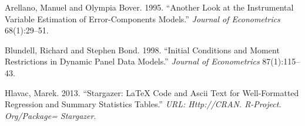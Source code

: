 \documentclass[
  12pt,
]{article}
\begin{document}
\leavevmode\hypertarget{ref-arellano1995another}{}%
Arellano, Manuel and Olympia Bover. 1995. ``Another Look at the Instrumental Variable Estimation of Error-Components Models.'' \emph{Journal of Econometrics} 68(1):29--51.

\leavevmode\hypertarget{ref-bb98}{}%
Blundell, Richard and Stephen Bond. 1998. ``Initial Conditions and Moment Restrictions in Dynamic Panel Data Models.'' \emph{Journal of Econometrics} 87(1):115--43.

\leavevmode\hypertarget{ref-hlavac2013stargazer}{}%
Hlavac, Marek. 2013. ``Stargazer: LaTeX Code and Ascii Text for Well-Formatted Regression and Summary Statistics Tables.'' \emph{URL: Http://CRAN. R-Project. Org/Package= Stargazer}.
\end{document}
